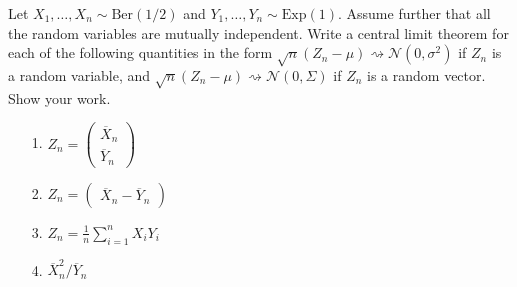 \documentclass[a4paper]{article}
\begin{document}
\begin{Exercise}
	Let $X_1, \ldots , X_n \sim \text{Ber}(1/2)$ and $Y_1, \ldots , Y_n \sim \text{Exp}(1)$. Assume further that all the random variables are mutually independent. Write a central limit theorem for each of the following quantities in the form $\sqrt{n}(Z_n - \mu) \rightsquigarrow \mathcal{N}(0, \sigma^2)$ if $Z_n$ is a random variable, and $\sqrt{n}(Z_n - \mu) \rightsquigarrow \mathcal{N}(0, \Sigma)$ if $Z_n$ is a random vector. Show your work.
	\begin{itemize}
		\item[1.] $Z_n = \begin{pmatrix}
				\overline{X}_n \\ \overline{Y}_n
			\end{pmatrix}$
		\item[2.] $Z_n = \begin{pmatrix}
				\overline{X}_n - \overline{Y}_n
			\end{pmatrix}$
		\item[3.] $Z_n = \frac{1}{n} \sum_{i = 1}^{n} X_i Y_i$
		\item[4.] $\overline{X}_n^2/\overline{Y}_n$
	\end{itemize}
\end{Exercise}
\end{document}
